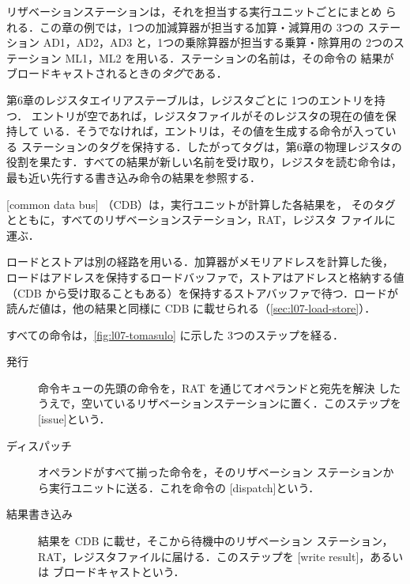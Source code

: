 \documentclass[../main.tex]{subfiles}
\begin{document}
リザベーションステーションは，それを担当する実行ユニットごとにまとめ
られる．この章の例では，1つの加減算器が担当する加算・減算用の 3つの
ステーション AD1，AD2，AD3 と，1つの乗除算器が担当する乗算・除算用の
2つのステーション ML1，ML2 を用いる．ステーションの名前は，その命令の
結果がブロードキャストされるときの\emph{タグ}である．

第6章のレジスタエイリアステーブルは，レジスタごとに 1つのエントリを持つ．
エントリが空であれば，レジスタファイルがそのレジスタの現在の値を保持して
いる．そうでなければ，エントリは，その値を生成する命令が入っている
ステーションのタグを保持する．したがってタグは，第6章の物理レジスタの
役割を果たす．すべての結果が新しい名前を受け取り，レジスタを読む命令は，
最も近い先行する書き込み命令の結果を参照する．

\begin{definition}[共通データバス]
  \label{def:l07-cdb}
  [common data bus]%
  （CDB）は，実行ユニットが計算した各結果を，
  そのタグとともに，すべてのリザベーションステーション，RAT，レジスタ
  ファイルに運ぶ．
\end{definition}

ロードとストアは別の経路を用いる．加算器がメモリアドレスを計算した後，
ロードはアドレスを保持するロードバッファで，ストアはアドレスと格納する値
（CDB から受け取ることもある）を保持するストアバッファで待つ．ロードが
読んだ値は，他の結果と同様に CDB に載せられる（\cref{sec:l07-load-store}）．

すべての命令は，\cref{fig:l07-tomasulo} に示した 3つのステップを経る．
\begin{description}
  \item[発行] 命令キューの先頭の命令を，RAT を通じてオペランドと宛先を解決
    したうえで，空いているリザベーションステーションに置く．このステップを
    [issue]という．
  \item[ディスパッチ] オペランドがすべて揃った命令を，そのリザベーション
    ステーションから実行ユニットに送る．これを命令の
    [dispatch]という．
  \item[結果書き込み] 結果を CDB に載せ，そこから待機中のリザベーション
    ステーション，RAT，レジスタファイルに届ける．このステップを
    [write result]，あるいは
    ブロードキャストという．
\end{description}
\end{document}
